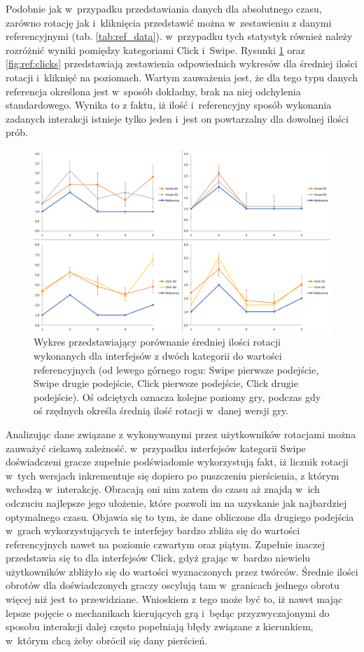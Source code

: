 \documentclass[a4paper,12pt,numbers=noenddot]{report}
\begin{document}
Podobnie jak w~przypadku przedstawiania danych dla absolutnego czasu, zarówno rotację jak i~kliknięcia przedstawić można w~zestawieniu z danymi referencyjnymi (tab. \ref{tab:ref_data}). w~przypadku tych statystyk również należy rozróżnić wyniki pomiędzy kategoriami Click i~Swipe. Rysunki
\ref{fig:ref:rotations} oraz \ref{fig:ref:clicks} przedstawiają zestawienia odpowiednich wykresów dla średniej ilości rotacji i~kliknięć na poziomach. Wartym zauważenia jest, że dla tego typu danych referencja określona jest w~sposób dokładny, brak na niej odchylenia standardowego. Wynika to z faktu, iż ilość i~referencyjny sposób wykonania zadanych interakcji istnieje tylko jeden i~jest on powtarzalny dla dowolnej ilości prób.

\begin{figure}[h!]
	\centering
  	\includegraphics[width=\linewidth]{diag/ref_rotations.png}
	\caption{Wykres przedstawiający porównanie średniej ilości rotacji wykonanych dla interfejsów z dwóch kategorii do wartości referencyjnych (od lewego górnego rogu: Swipe pierwsze podejście, Swipe drugie podejście, Click pierwsze podejście, Click drugie podejście). Oś odciętych oznacza kolejne poziomy gry, podczas gdy oś rzędnych określa średnią ilość rotacji w~danej wersji gry.}
	\label{fig:ref:rotations}
\end{figure}

Analizując dane związane z wykonywanymi przez użytkowników rotacjami można zauważyć ciekawą zależność. w~przypadku interfejsów kategorii Swipe doświadczeni gracze zupełnie podświadomie wykorzystują fakt, iż licznik rotacji w~tych wersjach inkrementuje się dopiero po puszczeniu pierścienia, z którym wchodzą w~interakcję. Obracają oni nim zatem do czasu aż znajdą w~ich odczuciu najlepsze jego ułożenie, które pozwoli im na uzyskanie jak najbardziej optymalnego czasu. Objawia się to tym, że dane obliczone dla drugiego podejścia w~grach wykorzystujących te interfejsy bardzo zbliża się do wartości referencyjnych nawet na poziomie czwartym oraz piątym. Zupełnie inaczej przedstawia się to dla interfejsów Click, gdyż grając w~bardzo niewielu użytkowników zbliżyło się do wartości wyznaczonych przez twórców. Średnie ilości obrotów dla doświadczonych graczy oscylują tam w~granicach jednego obrotu więcej niż jest to przewidziane. Wnioskiem z tego może być to, iż nawet mając lepsze pojęcie o mechanikach kierujących grą i~będąc przyzwyczajonymi do sposobu interakcji dalej często popełniają błędy związane z kierunkiem, w~którym chcą żeby obrócił się dany pierścień.
\end{document}
